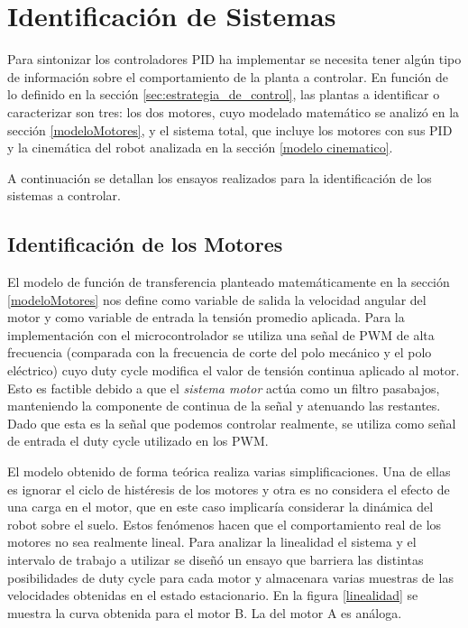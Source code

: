 \documentclass[10pt,conference,a4paper,onecolumn]{article}%
\begin{document}
\section{Identificación de Sistemas}
\label{sec:identifSist}
Para sintonizar los controladores PID ha implementar se necesita tener algún tipo de información sobre el comportamiento de la planta a controlar. En función de lo definido en la sección \ref{sec:estrategia_de_control}, las plantas a identificar o caracterizar son tres: los dos motores, cuyo modelado matemático se analizó en la sección \ref{modeloMotores}, y el sistema total, que incluye los motores con sus PID y la cinemática del robot analizada en la sección \ref{modelo cinematico}.

A continuación se detallan los ensayos realizados para la identificación de los sistemas a controlar.
\subsection{Identificación de los Motores}
El modelo de función de transferencia planteado matemáticamente en la sección \ref{modeloMotores} nos define como variable de salida la velocidad angular del motor y como variable de entrada la tensión promedio aplicada. Para la implementación con el microcontrolador se utiliza una señal de PWM de alta frecuencia (comparada con la frecuencia de corte del polo mecánico y el polo eléctrico) cuyo duty cycle modifica el valor de tensión continua aplicado al motor. Esto es factible debido a que el \textit{ sistema motor} actúa como un filtro pasabajos, manteniendo la componente de continua de la señal y atenuando las restantes. Dado que esta es la señal que podemos controlar realmente, se utiliza como señal de entrada el duty cycle utilizado en los PWM.

El modelo obtenido de forma teórica realiza varias simplificaciones. Una de ellas es ignorar el ciclo de histéresis de los motores y otra es no considera el efecto de una carga en el motor, que en este caso implicaría considerar la dinámica del robot sobre el suelo. Estos fenómenos hacen que el comportamiento real de los motores no sea realmente lineal. Para analizar la linealidad el sistema y el intervalo de trabajo a utilizar se diseñó un ensayo que barriera las distintas posibilidades de duty cycle para cada motor y almacenara varias muestras de las velocidades obtenidas en el estado estacionario. En la figura \ref{linealidad} se muestra la curva obtenida para el motor B. La del motor A es análoga. %
\end{document}
